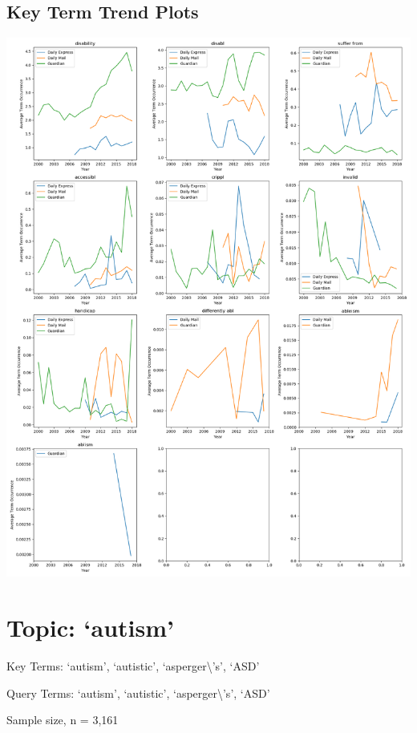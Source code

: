 \documentclass{report}
\begin{document}
\subsection{Key Term Trend Plots}
\includegraphics[width=\textwidth]{raw/disabled-terms.png}

\newpage
\section{Topic: `autism'}
Key Terms: `autism', `autistic', `asperger\textbackslash's', `ASD'

\noindent Query Terms: `autism', `autistic', `asperger\textbackslash's', `ASD'

\noindent Sample size, n = 3,161
\end{document}
